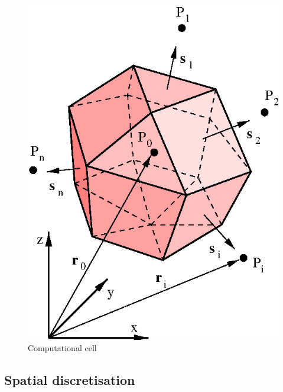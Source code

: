 \documentclass[10pt]{article}
\begin{document}
    \begin{figure}[h]
    \centering
    \includegraphics[scale=0.8]{molecule.eps}
    \caption{Computational cell}
    \end{figure}

    \subsection{Spatial discretisation}
\end{document}
